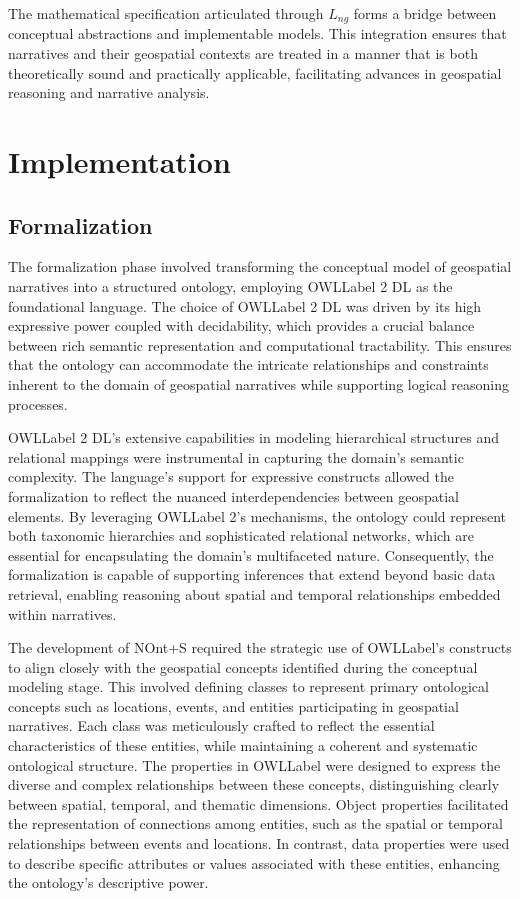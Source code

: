 The mathematical specification articulated through $L_{ng}$ forms a bridge between conceptual abstractions and implementable models. This integration ensures that narratives and their geospatial contexts are treated in a manner that is both theoretically sound and practically applicable, facilitating advances in geospatial reasoning and narrative analysis.

\section{Implementation}\label{IV-sec:implementation}


\subsection{Formalization}\label{IV-subsec:formalization}

The formalization phase involved transforming the conceptual model of geospatial narratives into a structured ontology, employing \acrshort{OWLLabel} 2 DL \cite{OWLWebOntologya} as the foundational language. The choice of \acrshort{OWLLabel} 2 DL was driven by its high expressive power coupled with decidability, which provides a crucial balance between rich semantic representation and computational tractability. This ensures that the ontology can accommodate the intricate relationships and constraints inherent to the domain of geospatial narratives while supporting logical reasoning processes.

\acrshort{OWLLabel} 2 DL’s extensive capabilities in modeling hierarchical structures and relational mappings were instrumental in capturing the domain’s semantic complexity. The language’s support for expressive constructs allowed the formalization to reflect the nuanced interdependencies between geospatial elements. By leveraging \acrshort{OWLLabel} 2’s mechanisms, the ontology could represent both taxonomic hierarchies and sophisticated relational networks, which are essential for encapsulating the domain's multifaceted nature. Consequently, the formalization is capable of supporting inferences that extend beyond basic data retrieval, enabling reasoning about spatial and temporal relationships embedded within narratives.

The development of NOnt+S required the strategic use of \acrshort{OWLLabel}’s constructs to align closely with the geospatial concepts identified during the conceptual modeling stage. This involved defining classes to represent primary ontological concepts such as locations, events, and entities participating in geospatial narratives. Each class was meticulously crafted to reflect the essential characteristics of these entities, while maintaining a coherent and systematic ontological structure. The properties in \acrshort{OWLLabel} were designed to express the diverse and complex relationships between these concepts, distinguishing clearly between spatial, temporal, and thematic dimensions. Object properties facilitated the representation of connections among entities, such as the spatial or temporal relationships between events and locations. In contrast, data properties were used to describe specific attributes or values associated with these entities, enhancing the ontology’s descriptive power.

